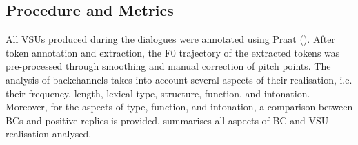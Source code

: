 \subsection{Procedure and Metrics}
\label{sec:4.2.2}
All VSUs produced during the dialogues were annotated using Praat (\citealt{BoersmaWeenink2021}). After token annotation and extraction, the F0 trajectory of the extracted tokens was pre-processed through smoothing and manual correction of pitch points. The analysis of backchannels takes into account several aspects of their realisation, i.e. their frequency, length, lexical type, structure, function, and intonation. Moreover, for the aspects of type, function, and intonation, a comparison between BCs and positive replies is provided.  summarises all aspects of BC and VSU realisation analysed.


\begin{table}
\caption{Aspects of BC and other VSU analysed and their operationalisations.}
\label{tab:4.2}
\end{table}


